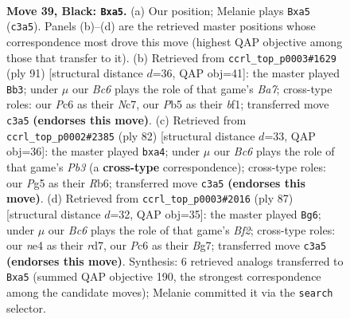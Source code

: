 \documentclass[11pt]{article}
\begin{document}
\clearpage

\begin{figure}[p]\centering
\begin{subfigure}{0.46\textwidth}\centering
\resizebox{\linewidth}{!}{%
\newchessgame
\chessboard[
  setfen={4R3/5pk1/2p1b3/Pp2P1p1/4N3/2b5/8/5K2 b - - 1 39},
  showmover=false,
  pgfstyle=straightmove, color=movearrow, markmove={c3-a5}
]}
\caption{}
\end{subfigure}\hfill
\begin{subfigure}{0.46\textwidth}\centering
\resizebox{\linewidth}{!}{%
\newchessgame
\chessboard[
  setfen={5b1R/2n1kp2/6p1/6P1/1N6/5K2/b7/5B2 b - - 15 46},
  showmover=false,
  pgfstyle=straightmove, color=movearrow, markmove={a2-b3}
]}
\caption{}
\end{subfigure}
\\[4pt]
\begin{subfigure}{0.46\textwidth}\centering
\resizebox{\linewidth}{!}{%
\newchessgame
\chessboard[
  setfen={8/8/1R5p/2nP1k2/p1P5/1P6/3r2B1/6K1 w - - 0 42},
  showmover=false,
  pgfstyle=straightmove, color=movearrow, markmove={b3-a4}
]}
\caption{}
\end{subfigure}\hfill
\begin{subfigure}{0.46\textwidth}\centering
\resizebox{\linewidth}{!}{%
\newchessgame
\chessboard[
  setfen={8/1p1R1bbk/2p4p/8/P1p5/4N3/5P2/6K1 b - - 1 44},
  showmover=false,
  pgfstyle=straightmove, color=movearrow, markmove={f7-g6}
]}
\caption{}
\end{subfigure}
\caption{\textbf{Move 39, Black: \texttt{Bxa5}.} (a) Our position; Melanie plays \texttt{Bxa5} (\texttt{c3a5}). Panels (b)--(d) are the retrieved master positions whose correspondence most drove this move (highest QAP objective among those that transfer to it). (b) Retrieved from \texttt{ccrl\_top\_p0003\#1629} (ply 91) [structural distance $d$=36, QAP obj=41]: the master played \texttt{Bb3}; under $\mu$ our \emph{Bc6} plays the role of that game's \emph{Ba7}; cross-type roles: our \emph{P}c6 as their \emph{N}c7, our \emph{P}b5 as their \emph{b}f1; transferred move \texttt{c3a5} \textbf{(endorses this move)}. (c) Retrieved from \texttt{ccrl\_top\_p0002\#2385} (ply 82) [structural distance $d$=33, QAP obj=36]: the master played \texttt{bxa4}; under $\mu$ our \emph{Bc6} plays the role of that game's \emph{Pb3} (a \textbf{cross-type} correspondence); cross-type roles: our \emph{P}g5 as their \emph{R}b6; transferred move \texttt{c3a5} \textbf{(endorses this move)}. (d) Retrieved from \texttt{ccrl\_top\_p0003\#2016} (ply 87) [structural distance $d$=32, QAP obj=35]: the master played \texttt{Bg6}; under $\mu$ our \emph{Bc6} plays the role of that game's \emph{Bf2}; cross-type roles: our \emph{n}e4 as their \emph{r}d7, our \emph{P}c6 as their \emph{B}g7; transferred move \texttt{c3a5} \textbf{(endorses this move)}. Synthesis: 6 retrieved analogs transferred to \texttt{Bxa5} (summed QAP objective 190, the strongest correspondence among the candidate moves); Melanie committed it via the \texttt{search} selector.}
\label{fig:thought-m77}
\end{figure}
\end{document}
